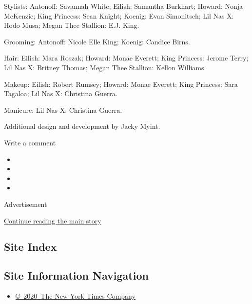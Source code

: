 Stylists: Antonoff: Savannah White; Eilish: Samantha Burkhart; Howard:
Nonja McKenzie; King Princess: Sean Knight; Koenig: Evan Simonitsch; Lil
Nas X: Hodo Musa; Megan Thee Stallion: E.J. King.

Grooming: Antonoff: Nicole Elle King; Koenig: Candice Birns.

Hair: Eilish: Mara Roszak; Howard: Monae Everett; King Princess: Jerome
Terry; Lil Nas X: Britney Thomas; Megan Thee Stallion: Kellon Williams.

Makeup: Eilish: Robert Rumsey; Howard: Monae Everett; King Princess:
Sara Tagaloa; Lil Nas X: Christina Guerra.

Manicure: Lil Nas X: Christina Guerra.

Additional design and development by Jacky Myint.

Write a comment

\begin{itemize}
\item
\item
\item
\item
\end{itemize}

Advertisement

\protect\hyperlink{after-bottom}{Continue reading the main story}

\hypertarget{site-index}{%
\subsection{Site Index}\label{site-index}}

\hypertarget{site-information-navigation}{%
\subsection{Site Information
Navigation}\label{site-information-navigation}}

\begin{itemize}
\tightlist
\item
  \href{https://help.nytimes3xbfgragh.onion/hc/en-us/articles/115014792127-Copyright-notice}{©~2020~The
  New York Times Company}
\end{itemize}

